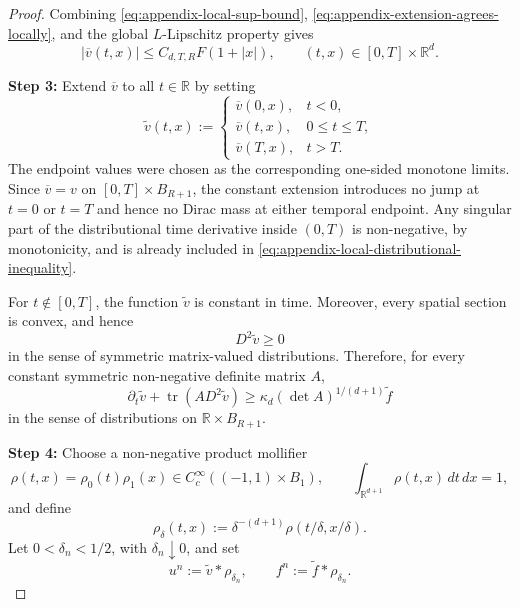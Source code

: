 \documentclass[12pt,oneside, reqno]{amsart}
\numberwithin{equation}{section}
\begin{document}
\begin{proof}
		Combining \eqref{eq:appendix-local-sup-bound},
		\eqref{eq:appendix-extension-agrees-locally}, and the global
		$L$-Lipschitz property gives
		\begin{equation}
			\label{eq:appendix-extension-growth}
			|\overline v(t,x)|
			\leq
			C_{d,T,R}F(1+|x|),
			\qquad
			(t,x)\in[0,T]\times\mathbb R^d.
		\end{equation}
		
		\medskip
		\noindent
		\textbf{Step 3: }
		Extend $\overline v$ to all $t\in\mathbb R$ by setting
		\begin{equation}
			\label{eq:appendix-time-extension}
			\widetilde v(t,x)
			:=
			\begin{cases}
				\overline v(0,x),&t<0,\\
				\overline v(t,x),&0\leq t\leq T,\\
				\overline v(T,x),&t>T.
			\end{cases}
		\end{equation}
		The endpoint values were chosen as the corresponding one-sided
		monotone limits. Since $\overline v=v$ on
		$[0,T]\times B_{R+1}$, the constant extension introduces no jump at
		$t=0$ or $t=T$ and hence no Dirac mass at either temporal endpoint.
		Any singular part of the distributional time derivative inside
		$(0,T)$ is non-negative, by monotonicity, and is already included in
		\eqref{eq:appendix-local-distributional-inequality}.
		
		For $t\notin[0,T]$, the function $\widetilde v$ is constant in
		time. Moreover, every spatial section is convex, and hence
		\[
		D^2\widetilde v\geq0
		\]
		in the sense of symmetric matrix-valued distributions. Therefore, for
		every constant symmetric non-negative definite matrix $A$,
		\begin{equation}
			\label{eq:appendix-extended-distributional-inequality}
			\partial_t\widetilde v
			+
			\operatorname{tr}(A D^2\widetilde v)
			\geq
			\kappa_d(\det A)^{1/(d+1)}\widetilde f
		\end{equation}
		in the sense of distributions on
		$\mathbb R\times B_{R+1}$.
		
		\medskip
		\noindent
		\textbf{Step 4: }
		Choose a non-negative product mollifier
		\[
		\rho(t,x)=\rho_0(t)\rho_1(x)
		\in C_c^\infty((-1,1)\times B_1),
		\qquad
		\int_{\mathbb R^{d+1}}\rho(t,x)\,dt\,dx=1,
		\]
		and define
		\[
		\rho_\delta(t,x)
		:=
		\delta^{-(d+1)}
		\rho(t/\delta,x/\delta).
		\]
		Let $0<\delta_n<1/2$, with $\delta_n\downarrow0$, and set
		\begin{equation}
			\label{eq:appendix-convolution-definition}
			u^n:=\widetilde v*\rho_{\delta_n},
			\qquad
			f^n:=\widetilde f*\rho_{\delta_n}.
		\end{equation}
		

\end{proof}
\end{document}
